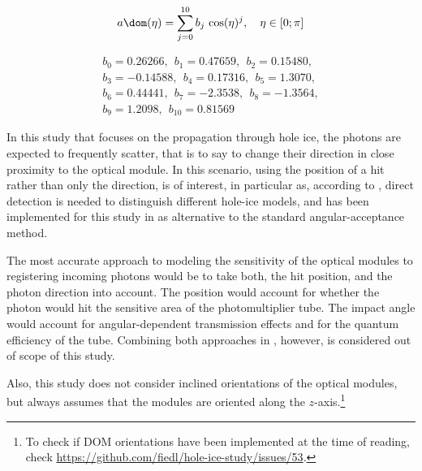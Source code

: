 \begin{equation}
  a\dom(\eta) = \sum_{j = 0}^{10} b_j\,\cos(\eta)^j, \ \ \ \eta \in [0; \pi]
  \label{eq:anominal}
\end{equation}

\begin{gather*}
   b_0 =  0.26266,  \ \  b_1    =  0.47659,   \ \ b_2 =  0.15480,  \\
   b_3 = -0.14588,  \ \  b_4    =  0.17316,   \ \ b_5 =  1.3070,   \\
   b_6 =  0.44441,  \ \  b_7    = -2.3538,    \ \ b_8 = -1.3564,   \\
   b_9 =  1.2098,   \ \  b_{10} =  0.81569
\end{gather*}


In this study that focuses on the propagation through hole ice, the photons are expected to frequently scatter, that is to say to change their direction in close proximity to the optical module. In this scenario, using the position of a hit rather than only the direction, is of interest, in particular as, according to \rongen \cite{martinspicehddard}, direct detection is needed to distinguish different hole-ice models, and has been implemented for this study in \clsim as alternative to the standard angular-acceptance method.


The most accurate approach to modeling the sensitivity of the optical modules to registering incoming photons would be to take both, the hit position, and the photon direction into account. The position would account for whether the photon would hit the sensitive area of the photomultiplier tube. The impact angle would account for angular-dependent transmission effects and for the quantum efficiency of the tube. Combining both approaches in \clsim, however, is considered out of scope of this study.\followup

Also, this study does not consider inclined orientations of the optical modules, but always assumes that the modules are oriented along the $z$-axis.\footnote{To check if DOM orientations have been implemented at the time of reading, check \url{https://github.com/fiedl/hole-ice-study/issues/53}.}


